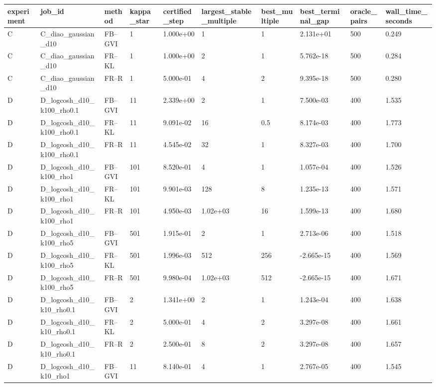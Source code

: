 \begin{tabular}{llllllllll}
\toprule
experiment & job\_id & method & kappa\_star & certified\_step & largest\_stable\_multiple & best\_multiple & best\_terminal\_gap & oracle\_pairs & wall\_time\_seconds \\
\midrule
C & C\_diao\_gaussian\_d10 & FB--GVI & 1 & 1.000e+00 & 1 & 1 & 2.131e+01 & 500 & 0.249 \\
C & C\_diao\_gaussian\_d10 & FR--KL & 1 & 1.000e+00 & 2 & 1 & 5.762e-18 & 500 & 0.284 \\
C & C\_diao\_gaussian\_d10 & FR--R & 1 & 5.000e-01 & 4 & 2 & 9.395e-18 & 500 & 0.280 \\
D & D\_logcosh\_d10\_k100\_rho0.1 & FB--GVI & 11 & 2.339e+00 & 2 & 1 & 7.500e-03 & 400 & 1.535 \\
D & D\_logcosh\_d10\_k100\_rho0.1 & FR--KL & 11 & 9.091e-02 & 16 & 0.5 & 8.174e-03 & 400 & 1.773 \\
D & D\_logcosh\_d10\_k100\_rho0.1 & FR--R & 11 & 4.545e-02 & 32 & 1 & 8.327e-03 & 400 & 1.700 \\
D & D\_logcosh\_d10\_k100\_rho1 & FB--GVI & 101 & 8.520e-01 & 4 & 1 & 1.057e-04 & 400 & 1.526 \\
D & D\_logcosh\_d10\_k100\_rho1 & FR--KL & 101 & 9.901e-03 & 128 & 8 & 1.235e-13 & 400 & 1.571 \\
D & D\_logcosh\_d10\_k100\_rho1 & FR--R & 101 & 4.950e-03 & 1.02e+03 & 16 & 1.599e-13 & 400 & 1.680 \\
D & D\_logcosh\_d10\_k100\_rho5 & FB--GVI & 501 & 1.915e-01 & 2 & 1 & 2.713e-06 & 400 & 1.518 \\
D & D\_logcosh\_d10\_k100\_rho5 & FR--KL & 501 & 1.996e-03 & 512 & 256 & -2.665e-15 & 400 & 1.569 \\
D & D\_logcosh\_d10\_k100\_rho5 & FR--R & 501 & 9.980e-04 & 1.02e+03 & 512 & -2.665e-15 & 400 & 1.671 \\
D & D\_logcosh\_d10\_k10\_rho0.1 & FB--GVI & 2 & 1.341e+00 & 2 & 1 & 1.243e-04 & 400 & 1.638 \\
D & D\_logcosh\_d10\_k10\_rho0.1 & FR--KL & 2 & 5.000e-01 & 4 & 2 & 3.297e-08 & 400 & 1.661 \\
D & D\_logcosh\_d10\_k10\_rho0.1 & FR--R & 2 & 2.500e-01 & 8 & 2 & 3.297e-08 & 400 & 1.657 \\
D & D\_logcosh\_d10\_k10\_rho1 & FB--GVI & 11 & 8.140e-01 & 4 & 1 & 2.767e-05 & 400 & 1.545 \\

\end{tabular}

